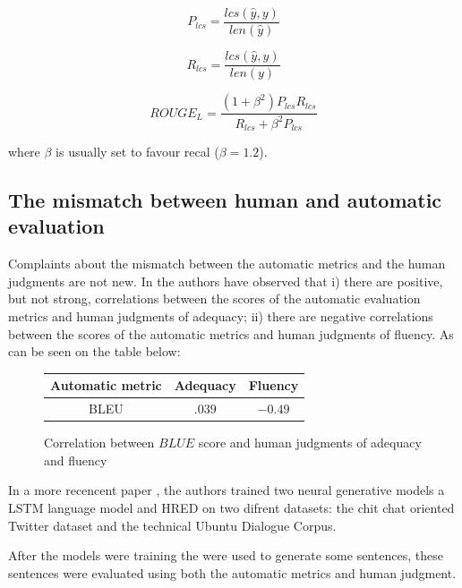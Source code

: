 \begin{equation*}
P_{lcs} = \frac{lcs(\hat{y}, y)}{len(\hat{y})}
\end{equation*}    


\begin{equation*}
R_{lcs} = \frac{lcs(\hat{y}, y)}{len(y)}
\end{equation*}

\begin{equation*}
ROUGE_L = \frac{(1 + \beta^2) P_{lcs} R_{lcs}}{R_{lcs} + \beta^{2}P_{lcs}}
\end{equation*}

where $\beta$ is usually set to favour recal ($\beta = 1.2$).

\subsection{The mismatch between human and automatic evaluation}

Complaints about the mismatch between the automatic metrics and the human judgments are not new. In  \cite{Stent} the authors have observed that i) there  are  positive,  but  not  strong,  correlations  between  the  scores  of the automatic evaluation metrics and human judgments of adequacy; ii) there are negative correlations between the scores of the automatic metrics and human judgments of fluency. As can be seen on the table below:

\begin{figure}[h]
\label{stenttable}
\begin{center}
\begin{tabular}{|c|c|c|}
\hline
\cellcolor{blue!10} Automatic metric & \cellcolor{blue!10} Adequacy & \cellcolor{blue!10} Fluency \\ \hline
BLEU & $.039$ & $-0.49$ \\ \hline
\end{tabular}
\end{center}
\caption{Correlation between $BLUE$ score and human judgments of adequacy and fluency \cite{Stent}}
\end{figure}


In a more recencent paper  \cite{LiuLSNCP16}, the authors trained two neural generative models a LSTM language model and HRED on two difrent datasets: the chit chat oriented Twitter dataset and the technical Ubuntu Dialogue Corpus.

After the models were training the were used to generate some sentences, these sentences were evaluated using both the automatic metrics and human judgment. 



